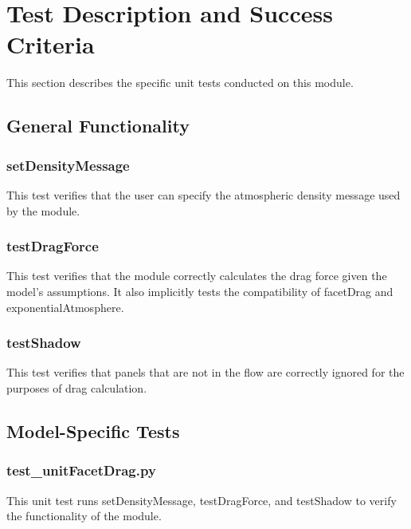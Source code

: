 
\section{Test Description and Success Criteria}
This section describes the specific unit tests conducted on this module.

\subsection{General Functionality}

\subsubsection{setDensityMessage}

This test verifies that the user can specify the atmospheric density message used by the module.

\subsubsection{testDragForce}

This test verifies that the module correctly calculates the drag force given the model's assumptions. It also implicitly tests the compatibility of facetDrag and exponentialAtmosphere. 

\subsubsection{testShadow}

This test verifies that panels that are not in the flow are correctly ignored for the purposes of drag calculation.

\subsection{Model-Specific Tests}

\subsubsection{test\_unitFacetDrag.py}

This unit test runs setDensityMessage, testDragForce, and testShadow to verify the functionality of the module. 

